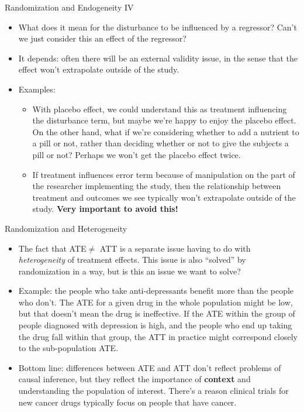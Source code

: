 \documentclass[aspectratio=169,11pt]{beamer}
\begin{document}
\begin{frame}{Randomization and Endogeneity IV}
\begin{itemize}
  \item What does it mean for the disturbance to be influenced by a regressor? 
  Can't we just consider this an effect of the regressor?
  
  \medskip
  \item It depends: often there will be an external validity issue, in the sense that
  the effect won't extrapolate outside of the study.
  
  \medskip
  \item Examples:
  \begin{itemize}
    \item With placebo effect, we could understand this as treatment influencing the
    disturbance term, but maybe we're happy to enjoy the placebo effect. On the other hand,
    what if we're considering whether to add a nutrient to a pill or not, rather than deciding
    whether or not to give the subjects a pill or not? Perhaps we won't get the placebo effect twice. 
    
    \item If treatment influences error term because of manipulation on the part of the researcher
    implementing the study, then the relationship between treatment and outcomes we see
    typically won't extrapolate outside of the study. {\bf Very important to avoid this!}
  \end{itemize}
\end{itemize}
\end{frame}





\begin{frame}{Randomization and Heterogeneity}
\begin{itemize}
  \item The fact that ATE$\ne$ ATT is a separate issue having to do with \emph{heterogeneity} of treatment effects.
  This issue is also ``solved'' by randomization in a way, but is this an issue we want to solve?

  \medskip
  \item Example: the people who take anti-depressants benefit more than the people who don't.
  The ATE for a given drug in the whole population might be low, but that doesn't mean the drug is
  ineffective. If the ATE within the group of people diagnosed with depression is high, and the people
  who end up taking the drug fall within that group, the ATT in practice might correspond closely to the sub-population ATE.

  \medskip
  \item Bottom line: differences between ATE and ATT don't reflect problems of causal inference, but they
  reflect the importance of {\bf context} and understanding the population of interest.
   There's a reason clinical trials for new cancer drugs typically focus on people that have cancer.


\end{itemize}
\end{frame}
\end{document}

